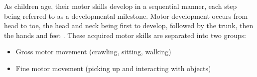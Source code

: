 \documentclass[landscape,final,paperwidth=48in,paperheight=33in,fontscale=0.285]{baposter}
\begin{document}
\begin{poster}
%
{

As children age, their motor skills develop in a sequential manner, each step being referred to as a developmental milestone. Motor development occurs from head to toe, the head and neck being first to develop, followed by the trunk, then the hands and feet \cite{Bachrach_undated-ss}.
These acquired motor skills are separated into two groups:
\begin{itemize}
    \item Gross motor movement (crawling, sitting, walking)
    \item Fine motor movement (picking up and interacting with objects)
\end{itemize}
    
}
\end{poster}
\end{document}
